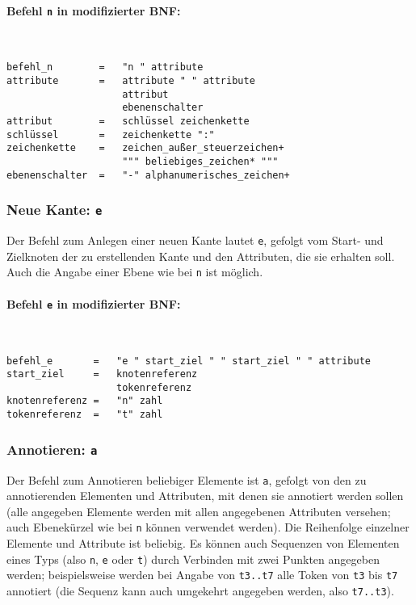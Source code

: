 \documentclass[12pt]{scrartcl}
\begin{document}
\paragraph*{Befehl \texttt{n} in modifizierter BNF:}
~
\begin{framed}
\begin{lstlisting}
befehl_n        =   "n " attribute
attribute       =   attribute " " attribute
                    attribut
                    ebenenschalter
attribut        =   schlüssel zeichenkette
schlüssel       =   zeichenkette ":"
zeichenkette    =   zeichen_außer_steuerzeichen+
                    """ beliebiges_zeichen* """
ebenenschalter  =   "-" alphanumerisches_zeichen+
\end{lstlisting}
\end{framed}


\subsubsection{Neue Kante: \texttt{e}}

Der Befehl zum Anlegen einer neuen Kante lautet \texttt{e}, gefolgt vom Start- und Zielknoten der zu erstellenden  Kante und den Attributen, die sie erhalten soll. Auch die Angabe einer Ebene wie bei \texttt{n} ist möglich.

\paragraph*{Befehl \texttt{e} in modifizierter BNF:}
~
\begin{framed}
\begin{lstlisting}
befehl_e       =   "e " start_ziel " " start_ziel " " attribute
start_ziel     =   knotenreferenz
                   tokenreferenz
knotenreferenz =   "n" zahl
tokenreferenz  =   "t" zahl
\end{lstlisting}
\end{framed}


\subsubsection{Annotieren: \texttt{a}}\label{befehl-a}

Der Befehl zum Annotieren beliebiger Elemente ist \texttt{a}, gefolgt von den zu annotierenden Elementen und Attributen, mit denen sie annotiert werden sollen (alle angegeben Elemente werden mit allen angegebenen Attributen versehen; auch Ebenekürzel wie bei \texttt{n} können verwendet werden). Die Reihenfolge einzelner Elemente und Attribute ist beliebig. Es können auch Sequenzen von Elementen eines Typs (also \texttt{n}, \texttt{e} oder \texttt{t}) durch Verbinden mit zwei Punkten angegeben werden; beispielsweise werden bei Angabe von \texttt{t3..t7} alle Token von \texttt{t3} bis \texttt{t7} annotiert (die Sequenz kann auch umgekehrt angegeben werden, also \texttt{t7..t3}).
\end{document}
